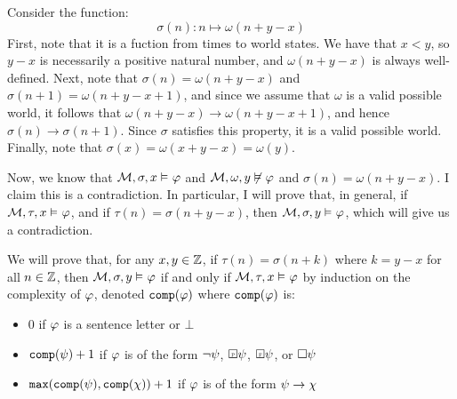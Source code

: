 \documentclass[a4paper, 11pt]{article}                  %
\begin{document}
\begin{enumerate}
{      Consider the function:
      \[
      \sigma(n): n \mapsto \omega(n + y - x)
      \]
      First, note that it is a fuction from times to world states.
      We have that $x<y$, so $y-x$ is necessarily a positive natural number, and $\omega(n + y - x)$ is always well-defined.
      Next, note that $\sigma(n) = \omega(n + y - x)$ and $\sigma(n + 1) = \omega(n + y - x + 1)$, and since we assume that $\omega$ is a valid possible world, it follows that $\omega(n + y - x) \to \omega(n + y - x + 1)$, and hence $\sigma(n) \to \sigma(n + 1)$.
      Since $\sigma$ satisfies this property, it is a valid possible world.
      Finally, note that $\sigma(x) = \omega(x + y - x) = \omega(y)$.

      Now, we know that $\mathcal{M}, \sigma, x \vDash_{} \varphi$ and $\mathcal{M}, \omega, y \not\vDash_{} \varphi$ and $\sigma(n)=\omega(n + y - x)$.
      I claim this is a contradiction.
      In particular, I will prove that, in general, if $\mathcal{M}, \tau, x \vDash_{} \varphi$, and if $\tau(n)=\sigma(n + y - x)$, then $\mathcal{M}, \sigma, y \vDash_{} \varphi$, which will give us a contradiction.

        We will prove that, for any $x, y \in \mathbb{Z}$, if $\tau(n)=\sigma(n+k)$ where $k=y-x$ for all $n \in \mathbb{Z}$, then $\mathcal{M}, \sigma, y \vDash_{} \varphi$ if and only if $\mathcal{M}, \tau, x \vDash_{} \varphi$ by induction on the complexity of $\varphi$, denoted $\texttt{comp}(\varphi)$ where $\texttt{comp}(\varphi)$ is:
        \begin{itemize}
          \item 0 if $\varphi$ is a sentence letter or $\bot$
          \item $\texttt{comp}(\psi)+1$ if $\varphi$ is of the form $\lnot\psi$, $\Past\metaB$, $\Future\metaB$, or $\Box\psi$
          \item $\texttt{max}(\texttt{comp}(\psi),\texttt{comp}(\chi)) + 1$ if $\varphi$ is of the form $\psi\to\chi$
        \end{itemize}

}
\end{enumerate}
\end{document}
